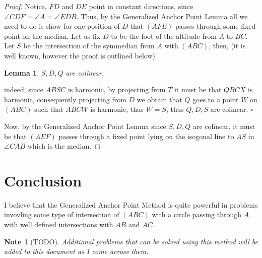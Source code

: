 \documentclass{article}
\newtheorem{note}{Note}
\newtheorem{lemma}{Lemma}
\begin{document}
\begin{proof}
  Notice, \(FD\) and \(DE\) point in constant directions, since \(\angle{CDF} = \angle{A} = \angle{EDB}\). Thus, by the Generalized Anchor Point Lemma all we need to do is show for one position of \(D\) that \((AFE)\) passes through some fixed point on the median. Let us fix \(D\) to be the foot of the altitude from \(A\) to \(BC\). Let \(S\) be the intersection of the symmedian from \(A\) with \((ABC)\), then, (it is well known, however the proof is outlined below)
  \begin{lemma}
    \(S, D, Q\) are colinear.
  \end{lemma}
  indeed, since \(ABSC\) is harmonic, by projecting from \(T\) it must be that \(QBCX\) is harmonic, consequently projecting from \(D\) we obtain that \(Q\) goes to a point \(W\) on \((ABC)\) such that \(ABCW\) is harmonic, thus \(W = S\), thus \(Q, D, S\) are colinear. \(\square\)

  Now, by the Generalized Anchor Point Lemma since \(S, D, Q\) are colinear, it must be that \((AEF)\) passes through a fixed point lying on the isogonal line to \(AS\) in \(\angle{CAB}\) which is the median.
\end{proof}

\section{Conclusion}

I believe that the Generalized Anchor Point Method is quite powerful in problems invovling some type of intersection of \((ABC)\) with a circle passing through \(A\) with well defined intersections with \(AB\) and \(AC\).

\begin{note}[TODO]
  Additional problems that can be solved using this method will be added to this document as I come across them.
\end{note}
\end{document}
